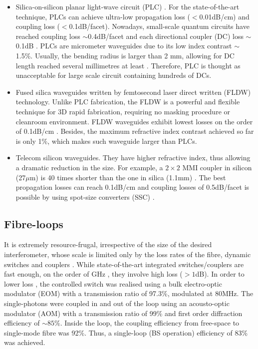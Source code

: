 \begin{itemize}
    \item Silica-on-silicon planar light-wave circuit (PLC) \cite{bib:hibino2003silica}. For the state-of-the-art technique, PLCs can achieve ultra-low propagation loss ($<$0.01dB/cm) and coupling loss ($<$0.1dB/facet). Nowadays, small-scale quantum circuits have reached coupling loss $\sim$0.4dB/facet and each directional coupler (DC) loss $\sim$0.1dB \cite{bib:carolan2015universal}. PLCs are micrometer waveguides due to its low index contrast $\sim$1.5\%. Usually, the bending radius is larger than 2 mm, allowing for DC length reached several millimetres at least \cite{bib:carolan2015universal}. Therefore, PLC is thought as unacceptable for large scale circuit containing hundreds of DCs.

    \item Fused silica waveguides written by femtosecond laser direct written (FLDW) technology. Unlike PLC fabrication, the FLDW is a powerful and flexible technique for 3D rapid fabrication, requiring no masking procedure or cleanroom environment. FLDW waveguides exhibit lowest losses on the order of 0.1dB/cm \cite{bib:sakuma2003ultra}. Besides, the maximum refractive index contrast achieved so far is only 1\%, which makes such waveguide larger than PLCs.

    \item Telecom silicon waveguides. They have higher refractive index, thus allowing a dramatic reduction in the size. For example, a \mbox{$2\times 2$} MMI coupler in silicon (27$\mu$m) \cite{bib:bonneau2012quantum} is 40 times shorter than the one in silica (1.1mm) \cite{bib:peruzzo2011}. The best propagation losses can reach 0.1dB/cm \cite{bib:lee2000, bib:gnan2008} and coupling losses of 0.5dB/facet is possible by using spot-size converters (SSC) \cite{bib:almeida2003, bib:mcnab2003}.
\end{itemize}

%
%

\subsection{Fibre-loops}  

It is extremely resource-frugal, irrespective of the size of the desired interferometer, whose scale is limited only by the loss rates of the fibre, dynamic switches and couplers \cite{bib:motes2014}. While state-of-the-art integrated switches/couplers are fast enough, on the order of GHz \cite{bib:winzer2010, bib:schindler2014}, they involve high loss ($>1$dB). In order to lower loss \cite{bib:he2016}, the controlled switch was realised using a bulk electro-optic modulator (EOM) with a transmission ratio of 97.3\%, modulated at 80MHz. The single-photons were coupled in and out of the loop using an acousto-optic modulator (AOM) with a transmission ratio of 99\% and first order diffraction efficiency of $\sim 85\%$. Inside the loop, the coupling efficiency from free-space to single-mode fibre was 92\%. Thus, a single-loop (BS operation) efficiency of 83\% was achieved.

